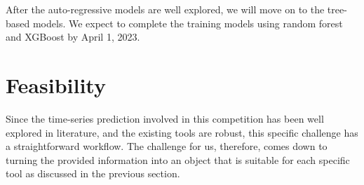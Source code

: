 \documentclass[prl,aps,superscriptaddress,twocolumn,10pt,nolongbibliography]{revtex4-2}
\begin{document}
After the auto-regressive models are well explored, we will move on to the tree-based models. 
We expect to complete the training models using random forest and XGBoost by April 1, 2023. 

\section{Feasibility}
Since the time-series prediction involved in this competition has been well explored in literature, and the existing tools are robust, this specific challenge has a straightforward workflow. 
The challenge for us, therefore, comes down to turning the provided information into an object that is suitable for each specific tool as discussed in the previous section.

{}
\end{document}
